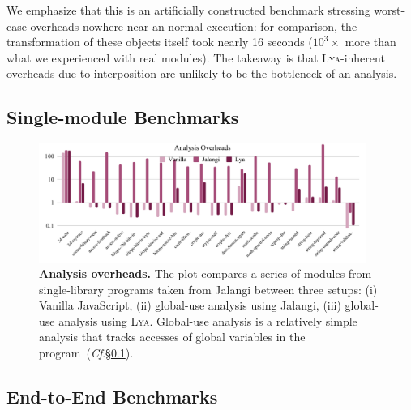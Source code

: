 \documentclass[letterpaper,twocolumn,10pt]{article}
\newcommand{\cf}[1]{(\emph{Cf}.\S\ref{#1})}
\newcommand{\sys}{{\scshape Lya}\xspace}
\begin{document}
We emphasize that this is an artificially constructed benchmark stressing worst-case overheads nowhere near an normal execution:
  for comparison, the transformation of these objects itself took nearly 16 seconds ($10^3\times$ more than what we experienced with real modules).
The takeaway is that \sys-inherent overheads due to interposition are unlikely to be the bottleneck of an analysis.

\subsection{Single-module Benchmarks}
\label{meso}

\begin{figure}[t]
  \centering
   \includegraphics[width=0.95\textwidth]{./figs/meso.pdf}
  \caption{
    \textbf{Analysis overheads.}
    The plot compares a series of modules from single-library programs taken from Jalangi between three setups:
		(i) Vanilla JavaScript, (ii) global-use analysis using Jalangi, (iii) global-use analysis using \sys.
    Global-use analysis is a relatively simple analysis that tracks accesses of global variables in the program~\cf{meso}.
  }
  \label{fig:meso}
  \vspace{-3mm}
\end{figure}


\subsection{End-to-End Benchmarks}
\label{macro}
\end{document}
